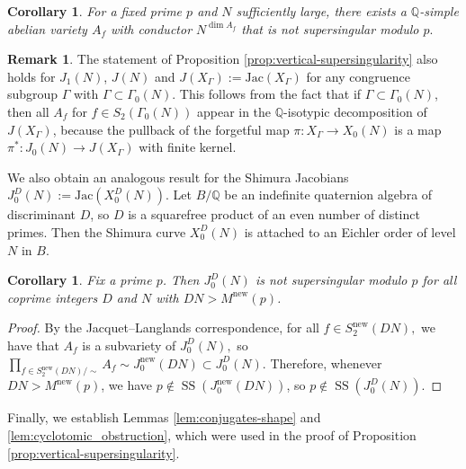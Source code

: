 \documentclass[11pt,letterpaper,reqno]{amsart}
\newtheorem{corollary}[theorem]{Corollary}
\theoremstyle{definition}
\newtheorem{remark}[theorem]{Remark}
\numberwithin{equation}{section}
\numberwithin{figure}{section}
\numberwithin{table}{section}
\newcommand{\nw}{\mathrm{new}}
\begin{document}
\begin{corollary}
For a fixed prime $p$ and $N$ sufficiently large, there exists a $\mathbb{Q}$-simple abelian variety $A_f$ with conductor $N^{\dim A_f}$ that is not supersingular modulo $p.$
\end{corollary}

\begin{remark}
The statement of Proposition \ref{prop:vertical-supersingularity} also holds for $J_1(N)$, $J(N)$ and $J(X_\Gamma):=\text{Jac}(X_\Gamma)$ for any congruence subgroup $\Gamma$ with $\Gamma \subset \Gamma_0 (N)$. This follows from the fact that if $\Gamma \subset \Gamma_0(N)$, 
then all $A_f$ for $f \in S_2(\Gamma_0(N))$ appear in the 
$\mathbb{Q}$-isotypic decomposition of $J(X_\Gamma)$, 
because the pullback of the 
forgetful map 
$\pi:X_\Gamma \to X_0(N)$ is a map $\pi^*:J_0(N) \to J(X_\Gamma)$ 
with finite kernel.
\end{remark}

We also obtain an analogous result for the Shimura Jacobians $J_0^D(N) := \text{Jac}(X_0^D(N))$. Let $B/\mathbb{Q}$ be an indefinite quaternion algebra of discriminant $D$, so $D$ is a squarefree product of an even number of distinct primes. Then the Shimura curve $X_0^D(N)$ is attached to an Eichler order of level $N$ in $B$. 

\begin{corollary}\label{cor:shimura}
Fix a prime $p$. Then $J_0^D(N)$ is not supersingular modulo $p$ for all coprime integers $D$ and $N$ with $DN > M^{\nw}(p)$.
\end{corollary}

\begin{proof}
By the Jacquet--Langlands correspondence, for all $f \in S_2^{\nw}(DN),$ we have that $A_f$ is a subvariety of $J_0^D(N),$ so $\prod_{f \in S_2^{\nw}(DN)/\sim} A_f \sim J_0^{\nw}(DN) \subset J_0^D(N)$. Therefore, whenever $DN > M^{\nw}(p)$, we have $p\notin \operatorname{SS}(J_0^{\nw}(DN))$, so $p\notin \operatorname{SS}(J_0^{D}(N))$.
\end{proof}

Finally, we establish Lemmas \ref{lem:conjugates-shape} and \ref{lem:cyclotomic_obstruction}, which were used in the proof of Proposition \ref{prop:vertical-supersingularity}.
\end{document}
